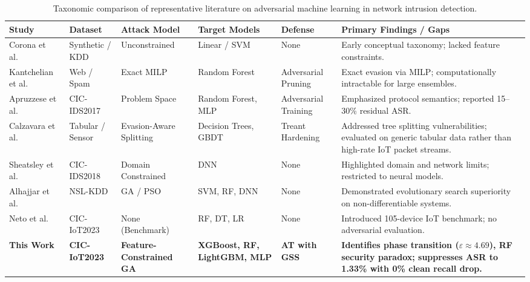 \documentclass[final,5p,times,twocolumn]{elsarticle}
\begin{document}
\begin{table}[t]
\centering
\footnotesize
\renewcommand{\arraystretch}{0.95}
{\linespread{0.95}\selectfont
\caption{Taxonomic comparison of representative literature on adversarial machine learning in network intrusion detection.}
\label{tab:related_work}
\begin{tabularx}{\textwidth}{l p{1.9cm} p{2.1cm} p{2.3cm} p{2.0cm} X}
\toprule
\textbf{Study} & \textbf{Dataset} & \textbf{Attack Model} & \textbf{Target Models} & \textbf{Defense} & \textbf{Primary Findings / Gaps} \\
\midrule
Corona et al.~\cite{corona2013adversarial} & Synthetic / KDD & Unconstrained & Linear / SVM & None & Early conceptual taxonomy; lacked feature constraints. \\
Kantchelian et al.~\cite{kantchelian2016evasion} & Web / Spam & Exact MILP & Random Forest & Adversarial Pruning & Exact evasion via MILP; computationally intractable for large ensembles. \\
Apruzzese et al.~\cite{apruzzese2022modeling} & CIC-IDS2017 & Problem Space & Random Forest, MLP & Adversarial Training & Emphasized protocol semantics; reported 15--30\% residual ASR. \\
Calzavara et al.~\cite{calzavara2020treant} & Tabular / Sensor & Evasion-Aware Splitting & Decision Trees, GBDT & Treant Hardening & Addressed tree splitting vulnerabilities; evaluated on generic tabular data rather than high-rate IoT packet streams. \\
Sheatsley et al.~\cite{sheatsley2022space} & CIC-IDS2018 & Domain Constrained & DNN & None & Highlighted domain and network limits; restricted to neural models. \\
Alhajjar et al.~\cite{alhajjar2021adversarial} & NSL-KDD & GA / PSO & SVM, RF, DNN & None & Demonstrated evolutionary search superiority on non-differentiable systems. \\
Neto et al.~\cite{neto2023ciciot2023} & CIC-IoT2023 & None (Benchmark) & RF, DT, LR & None & Introduced 105-device IoT benchmark; no adversarial evaluation. \\
\midrule
\textbf{This Work} & \textbf{CIC-IoT2023} & \textbf{Feature-Constrained GA} & \textbf{XGBoost, RF, LightGBM, MLP} & \textbf{AT with GSS} & \textbf{Identifies phase transition ($\varepsilon \approx 4.69$), RF security paradox; suppresses ASR to 1.33\% with 0\% clean recall drop.} \\
\bottomrule
\end{tabularx}
\par}
\end{table}
\end{document}
